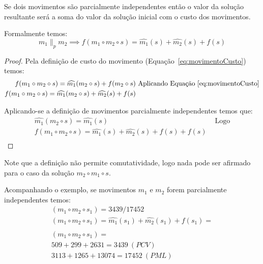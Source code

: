 \begin{corolario}
Se dois movimentos são parcialmente independentes então o valor da solução resultante será a soma do valor da solução inicial com o custo dos movimentos.

Formalmente temos:
\begin{equation}
m_1 \parallel_p m_2 \implies f(m_1 \circ m_2 \circ s) = \widehat{m_1}(s) + \widehat{m_2}(s) + f(s)
\end{equation}

\begin{proof}
Pela definição de custo do movimento (Equação~\ref{eq:movimentoCusto}) temos:
\begin{align*}
f(m_1 \circ m_2 \circ s) = \widehat{m_1}(m_2 \circ s) + f(m_2 \circ s) & \textrm{ Aplicando Equação~\ref{eq:movimentoCusto}} \\
f(m_1 \circ m_2 \circ s) = \widehat{m_1}(m_2 \circ s) + \widehat{m_2}(s) + f(s) &
\end{align*}

Aplicando-se a definição de movimentos parcialmente independentes temos que:
\begin{align*}
\widehat{m_1}(m_2 \circ s) = \widehat{m_1}(s) & \textrm{ Logo}\\
f(m_1 \circ m_2 \circ s) = \widehat{m_1}(s) + \widehat{m_2}(s) + f(s) + f(s) & \\
\end{align*}
\end{proof}
\end{corolario}

Note que a definição não permite comutatividade, logo nada pode ser afirmado para o caso da solução $m_2 \circ m_1 \circ s$.

Acompanhando o exemplo, se movimentos $m_1$ e $m_2$ forem parcialmente independentes temos:
\begin{gather*}
(m_1 \circ m_2 \circ s_1) = 3439/17452 \\
(m_1 \circ m_2 \circ s_1)= \widehat{m_1}(s_1) + \widehat{m_2}(s_1) + f(s_1) = \\ \\
(m_1 \circ m_2 \circ s_1) = \\
509 + 299 + 2631 = 3439 \ (PCV)\\
3113+1265+13074 = 17452 \ (PML)
\end{gather*}

